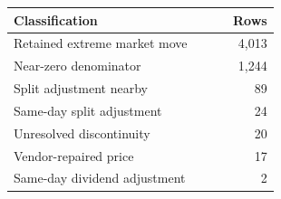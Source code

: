 {\small
\begin{tabular}{@{}p{0.70\linewidth}r@{}}
\toprule
Classification & Rows \\
\midrule
Retained extreme market move & 4,013 \\
Near-zero denominator & 1,244 \\
Split adjustment nearby & 89 \\
Same-day split adjustment & 24 \\
Unresolved discontinuity & 20 \\
Vendor-repaired price & 17 \\
Same-day dividend adjustment & 2 \\
\bottomrule
\end{tabular}
}
